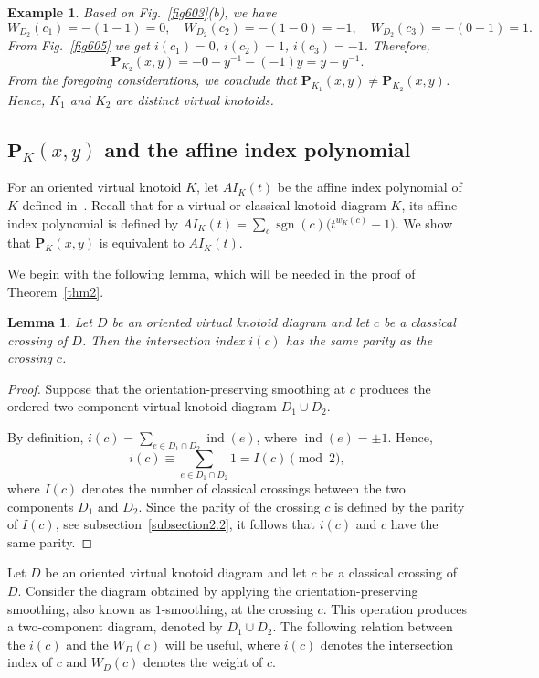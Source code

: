 \documentclass[12pt]{amsart}
\theoremstyle{noparens}
\newtheorem{lemma}{Lemma}[section]
\newtheorem{example}{Example}[section]
\numberwithin{equation}{section}
\numberwithin{equation}{section}
\begin{document}
\begin{example}
{		Based on Fig.~\ref{fig603}(b), we have 
		$$
		W_{D_2}(c_1)=-(1-1)=0, \quad W_{D_2}(c_2)=-(1-0)=-1, \quad
		W_{D_2}(c_3)=-(0-1)=1.
		$$ 
		From Fig.~\ref{fig605} we get $i(c_1)=0$, $i(c_2)=1$, $i(c_3)=-1$. Therefore, 
		$$
		\mathbf{P}_{K_2}(x,y)=-0-y^{-1}-(-1)y=y-y^{-1}.
		$$ 
		From the foregoing considerations, we conclude that $\mathbf{P}_{K_1}(x,y)\neq \mathbf{P}_{K_2}(x,y)$. Hence, $K_1$ and $K_2$ are distinct virtual knotoids.    
	}
\end{example}

\subsection{$\mathbf{P}_K(x,y)$ and the affine index polynomial} \label{subsection3.1}

For an oriented virtual knotoid $K$, let $AI_K(t)$ be the affine index polynomial of $K$ defined in~\cite{GK}. Recall that for a virtual or classical knotoid diagram $K$, its affine index polynomial is defined by $AI_K(t)=\sum_{c}\operatorname{sgn}(c)\bigl(t^{w_K(c)}-1\bigr)$. We show that $\mathbf{P}_K(x,y)$ is equivalent to $AI_K(t)$.


We begin with the following lemma, which will be needed in the proof of Theorem~\ref{thm2}.	

\begin{lemma}\label{lm2}
	Let $D$ be an oriented virtual knotoid diagram and let $c$ be a classical crossing of $D$. Then the intersection index $i(c)$ has the same parity as the crossing $c$.
\end{lemma}

\begin{proof}
	Suppose that the orientation-preserving smoothing at $c$ produces the ordered two-component virtual knotoid diagram $D_1\cup D_2$.
	
	By definition,
	$ i(c)=\sum_{e\in D_1\cap D_2}\operatorname{ind}(e)$,	
	where $\operatorname{ind}(e)=\pm1$. Hence,
	$$
	i(c)\equiv
	\sum_{e\in D_1\cap D_2}1=I(c)\pmod2,
	$$
	where $I(c)$ denotes the number of classical crossings between the two components $D_1$ and $D_2$. Since the parity of the crossing $c$ is defined by the parity of $I(c)$, see subsection~\ref{subsection2.2}, it follows that $i(c)$ and $c$ have the same parity.
\end{proof}

Let $D$ be an oriented virtual knotoid diagram and let $c$ be a classical crossing of $D$. Consider the diagram obtained by applying the orientation-preserving smoothing, also known as  $1$-smoothing, at the crossing $c$. This operation produces a two-component diagram, denoted by $D_1 \cup D_2$. The following relation between the $i(c)$ and the $W_D(c)$ will be useful, where $i(c)$ denotes the intersection index of $c$ and $W_D(c)$ denotes the weight of $c$.
\end{document}
